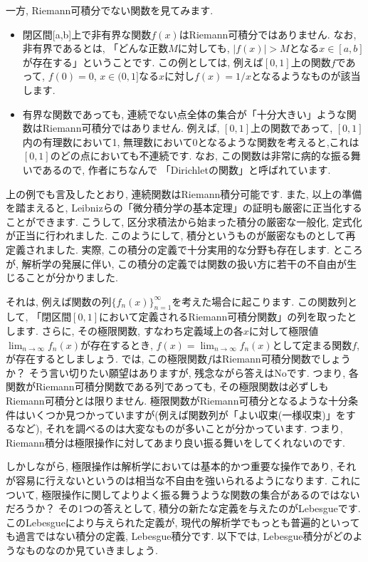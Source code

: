 \par 一方, Riemann可積分でない関数を見てみます. 
\begin{itemize}
\item 閉区間[a,b]上で非有界な関数$f(x)$はRiemann可積分ではありません. なお, 非有界であるとは, 「どんな正数$M$に対しても, $\left|f(x)\right|>M$となる$x\in[a,b]$が存在する」ということです. この例としては, 例えば$[0,1]$上の関数$f$であって, $f(0)=0$, $x\in(0,1]$なる$x$に対し$f(x)=1/x$となるようなものが該当します. 
\item 有界な関数であっても, 連続でない点全体の集合が「十分大きい」ような関数はRiemann可積分ではありません. 例えば, $[0,1]$上の関数であって, $[0,1]$内の有理数において1, 無理数において0となるような関数を考えると,これは $[0,1]$のどの点においても不連続です. なお, この関数は非常に病的な振る舞いであるので, 作者にちなんで 「Dirichletの関数」と呼ばれています. 
\end{itemize}
\par 上の例でも言及したとおり, 連続関数はRiemann積分可能です. また, 以上の準備を踏まえると, Leibnizらの「微分積分学の基本定理」の証明も厳密に正当化することができます. こうして, 区分求積法から始まった積分の厳密な一般化, 定式化が正当に行われました. 
このようにして, 積分というものが厳密なものとして再定義されました. 実際, この積分の定義で十分実用的な分野も存在します. ところが, 解析学の発展に伴い, この積分の定義では関数の扱い方に若干の不自由が生じることが分かりました. 
\par それは, 例えば関数の列$\{f_n(x)\}_{n=1}^{\infty}$を考えた場合に起こります. この関数列として, 「閉区間$[0,1]$において定義されるRiemann可積分関数」の列を取ったとします. さらに, その極限関数, すなわち定義域上の各$x$に対して極限値$\displaystyle\lim _{n \to \infty}f_{n}(x)$が存在するとき, $f(x)=\displaystyle\lim _{n \to \infty}f_{n}(x)$として定まる関数$f$, が存在するとしましょう. では, この極限関数$f$はRiemann可積分関数でしょうか？ そう言い切りたい願望はありますが, 残念ながら答えはNoです. つまり, 各関数がRiemann可積分関数である列であっても, その極限関数は必ずしもRiemann可積分とは限りません. 極限関数がRiemann可積分となるような十分条件はいくつか見つかっていますが(例えば関数列が「よい収束(一様収束)」をするなど), それを調べるのは大変なものが多いことが分かっています. つまり, Riemann積分は極限操作に対してあまり良い振る舞いをしてくれないのです. 
\par しかしながら, 極限操作は解析学においては基本的かつ重要な操作であり, それが容易に行えないというのは相当な不自由を強いられるようになります. これについて, 極限操作に関してよりよく振る舞うような関数の集合があるのではないだろうか？ その1つの答えとして, 積分の新たな定義を与えたのがLebesgueです. このLebesgueにより与えられた定義が, 現代の解析学でもっとも普遍的といっても過言ではない積分の定義, Lebesgue積分です. 以下では, Lebesgue積分がどのようなものなのか見ていきましょう. 

